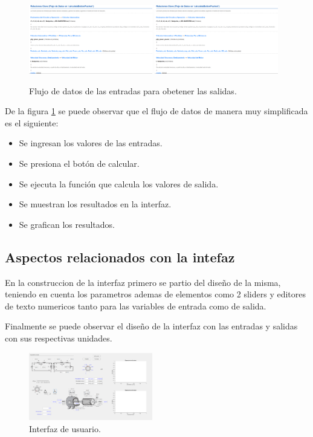 \begin{figure}[ht!]
    \centering
    \includegraphics[width=0.48\textwidth]{imginterfaz/button.png}
    \includegraphics[width=0.48\textwidth]{imginterfaz/button.png}
    \caption{Flujo de datos de las entradas para obetener las salidas.\label{fig:button}}
\end{figure}

De la figura \ref*{fig:button} se puede observar que el flujo de datos de manera muy simplificada es el siguiente:
\begin{itemize}
    \item Se ingresan los valores de las entradas.
    \item Se presiona el botón de calcular.
    \item Se ejecuta la función que calcula los valores de salida.
    \item Se muestran los resultados en la interfaz.
    \item Se grafican los resultados.
\end{itemize}


\subsection{Aspectos relacionados con la intefaz}
En la construccion de la interfaz primero se partio del diseño de la misma, teniendo en cuenta los parametros ademas de elementos como 2 sliders y editores de texto numericos tanto para las variables de entrada como de salida.
   



Finalmente se puede observar el diseño de la interfaz con las entradas y salidas con sus respectivas unidades.
\begin{figure}[ht!]
    \centering
    \includegraphics[width=0.48\textwidth]{imginterfaz/interfaz.png}
    \caption{Interfaz de usuario.}
    \label{fig:interfaz}
\end{figure}